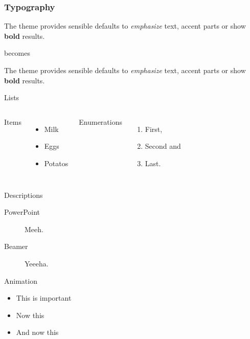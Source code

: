 \documentclass{beamer}
\begin{document}
\begin{frame}[fragile]
  \frametitle{Typography}

The theme provides sensible defaults to \emph{emphasize}
text, \alert{accent} parts or show \textbf{bold} results.


  \begin{center}becomes\end{center}

  The theme provides sensible defaults to \emph{emphasize} text,
  \alert{accent} parts or show \textbf{bold} results.
\end{frame}
\begin{frame}{Lists}
  \begin{columns}[onlytextwidth]
      Items
      \begin{itemize}
        \item Milk \item Eggs \item Potatos
      \end{itemize}

      Enumerations
      \begin{enumerate}
        \item First, \item Second and \item Last.
      \end{enumerate}
  \end{columns}
\end{frame}
\begin{frame}{Descriptions}
  \begin{description}
    \item[PowerPoint] Meeh.
    \item[Beamer] Yeeeha.
  \end{description}
\end{frame}
\begin{frame}{Animation}
  \begin{itemize}[<+- | alert@+>]
    \item \alert<4>{This is important}
    \item Now this
    \item And now this
  \end{itemize}
\end{frame}
\end{document}
